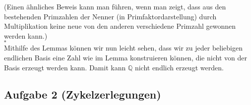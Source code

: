 \documentclass[11pt,a4paper,ngerman]{article}
\newcommand{\Q}{\mathbb{Q}}
\begin{document}
(Einen ähnliches Beweis kann man führen, wenn man zeigt, dass aus den bestehenden Primzahlen der Nenner (in Primfaktordarstellung) durch Multiplikation keine neue von den anderen verschiedene Primzahl gewonnen werden kann.)\\
\mbox{} \hfill $\square$\\

Mithilfe des Lemmas können wir nun leicht sehen, dass wir zu jeder beliebigen endlichen Basis eine Zahl wie im Lemma konstruieren können, die nicht von der Basis erzeugt werden kann. Damit kann $\Q$ nicht endlich erzeugt werden.


\pagebreak

\subsection*{Aufgabe 2 \mdseries (Zykelzerlegungen)}
\end{document}
